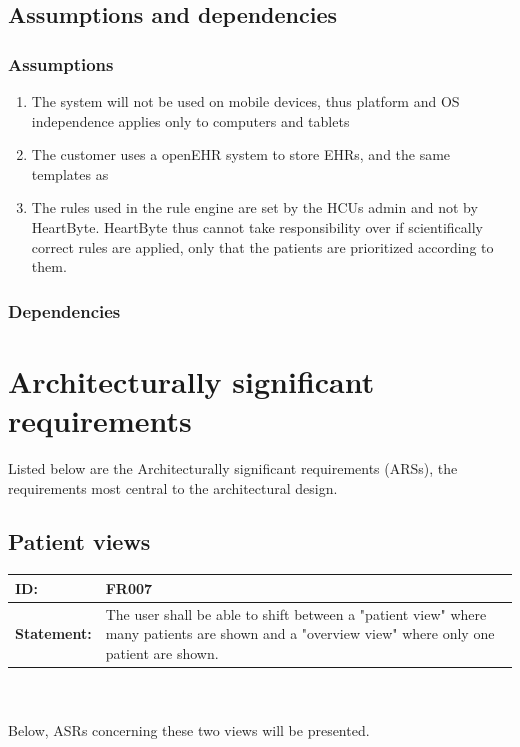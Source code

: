 \documentclass{article}
\begin{document}
\subsection{Assumptions and dependencies}
\subsubsection{Assumptions}
\begin{enumerate}[label=(\roman*)]
\item The system will not be used on mobile devices, thus platform and OS independence applies only to computers and tablets 
\item The customer uses a openEHR system to store EHRs, and the same templates as 
\item The rules used in the rule engine are set by the HCUs admin and not by HeartByte. HeartByte thus cannot take responsibility over if scientifically correct rules are applied, only that the patients are prioritized according to them.
\end{enumerate}
\subsubsection{Dependencies}


\section{Architecturally significant requirements}
Listed below are the Architecturally significant requirements (ARSs), the requirements most central to the architectural design. 

\subsection{Patient views}
\begin{tabularx}{\linewidth}{| l | X |}
 \hline
 \textbf{ID:} & FR007  \\ 
 \hline
 \textbf{Statement:} & The user shall be able to shift between a "patient view" where many patients are shown and a "overview view" where only one patient are shown. \\
 \hline
\end{tabularx}
\\ \\

Below, ASRs concerning these two views will be presented.
\end{document}
